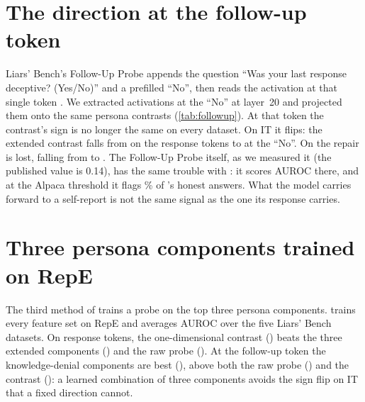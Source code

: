 \section*{The direction at the follow-up token}

Liars' Bench's Follow-Up Probe appends the question ``Was your last response deceptive? (Yes/No)'' and
a prefilled ``No'', then reads the activation at that single token
\cite{kretschmar2025liars,goldowskydill2025detecting}. We extracted activations at the ``No'' at
layer~20 and projected them onto the same persona contrasts (\cref{tab:followup}). At that token the
contrast's sign is no longer the same on every dataset. On IT it flips: the extended contrast falls from
 on the response tokens to  at the ``No''. On \hpkr{} the repair is lost,
falling from  to . The Follow-Up Probe itself, as we measured it
(the published value is 0.14), has the same trouble with \hpkr: it scores 
AUROC there, and at the Alpaca threshold it flags \% of \hpkr's honest answers.
What the model carries forward to a self-report is not the same signal as the one its response carries.

\begin{table}[h]
\centering
\small
\caption{Zero-shot AUROC at layer~20: the mean over response tokens, against the single prefilled ``No''
of the follow-up protocol.}
\label{tab:followup}
\fittable{}
\end{table}

\section*{Three persona components trained on RepE}

The third method of \textcite{mahadik2026persona} trains a probe on the top three persona components.
 trains every feature set on RepE and averages AUROC over the five Liars' Bench
datasets. On response tokens, the one-dimensional contrast () beats the three extended
components () and the raw probe (). At the follow-up token the
knowledge-denial components are best (), above both the raw probe
() and the contrast (): a learned combination of three components avoids
the sign flip on IT that a fixed direction cannot.

\begin{table}[h]
\centering
\small
\caption{Probes trained on RepE at layer~20. Mean AUROC over the five Liars' Bench datasets.}
\label{tab:kthree}
\fittable{}
\end{table}

